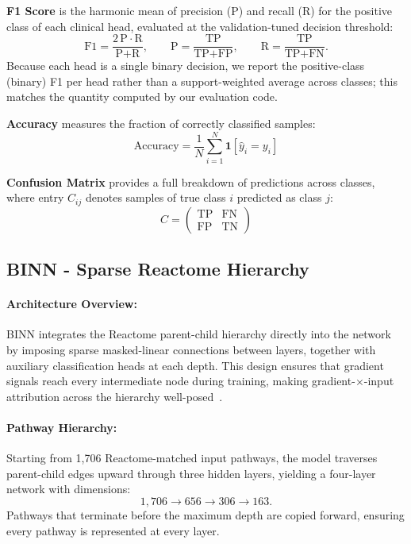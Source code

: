 \documentclass[sigconf]{acmart}
\begin{document}
\textbf{F1 Score} is the harmonic mean of precision (P) and recall (R) for
the positive class of each clinical head, evaluated at the
validation-tuned decision threshold:
\begin{equation}
    \text{F1} = \frac{2\,\text{P}\cdot\text{R}}{\text{P}+\text{R}},
    \qquad
    \text{P} = \frac{\text{TP}}{\text{TP}+\text{FP}},
    \qquad
    \text{R} = \frac{\text{TP}}{\text{TP}+\text{FN}}.
\end{equation}
Because each head is a single binary decision, we report the positive-class
(binary) F1 per head rather than a support-weighted average across classes;
this matches the quantity computed by our evaluation code.

\textbf{Accuracy} measures the fraction of correctly classified samples:
\begin{equation}
    \text{Accuracy} = \frac{1}{N} \sum_{i=1}^{N}
    \mathbf{1}\!\left[\hat{y}_i = y_i\right]
\end{equation}

\textbf{Confusion Matrix} provides a full breakdown of predictions across
classes, where entry $C_{ij}$ denotes samples of true class $i$ predicted
as class $j$:
\begin{equation}
    C =
    \begin{pmatrix}
        \text{TP} & \text{FN} \\
        \text{FP} & \text{TN}
    \end{pmatrix}
\end{equation}

\subsection{BINN - Sparse Reactome Hierarchy}

\paragraph{Architecture Overview:}
BINN integrates the Reactome parent-child hierarchy directly into the
network by imposing sparse masked-linear connections between layers,
together with auxiliary classification heads at each depth. This
design ensures that gradient signals reach every intermediate node
during training, making gradient-$\times$-input attribution across
the hierarchy well-posed~\cite{lundberg2017shap}.

\paragraph{Pathway Hierarchy:}
Starting from 1,706 Reactome-matched input pathways, the model
traverses parent-child edges upward through three hidden layers,
yielding a four-layer network with dimensions:
\begin{equation}
1{,}706 \to 656 \to 306 \to 163.
\end{equation}
Pathways that terminate before the maximum depth are copied forward,
ensuring every pathway is represented at every layer.
\end{document}
